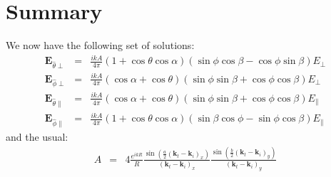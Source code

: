 \documentclass[a4article,12pt]{article}
\newcommand{\kvec}[0]{{\mathbf k}}
\newcommand{\Evec}[0]{{\mathbf E}}
\begin{document}
\section{Summary}

We now have the following set of solutions:
%
\begin{eqnarray}
\Evec_{\hat{\theta} \perp} & = & \frac{i k A}{4 \pi} \left( 1 + \cos \theta \cos \alpha \right) \left(\sin \phi \cos \beta - \cos \phi \sin \beta \right) E_{\perp}\\
\Evec_{\hat{\phi} \perp} & = & \frac{i k A}{4 \pi} \left(\cos \alpha + \cos \theta \right)  \left( \sin \phi \sin \beta + \cos \phi \cos \beta \right) E_{\perp} \\
\Evec_{\hat{\theta} \parallel} & = & \frac{i k A}{4 \pi} \left( \cos \alpha + \cos \theta \right) \left(\sin \phi \sin \beta + \cos \phi \cos \beta  \right) E_{\parallel} \\
\Evec_{\hat{\phi} \parallel} & = & \frac{i k A}{4 \pi} \left( 1+ \cos \theta \cos \alpha \right) \left( \sin \beta \cos \phi - \sin \phi \cos \beta \right) E_{\parallel}
\end{eqnarray}
%
and the usual:
%
\begin{eqnarray}
A & = & 4 \frac{e^{i k R}}{R} \frac{\sin \left( \frac{a}{2} (\kvec_t - \kvec_i )_x \right)}{(\kvec_t - \kvec_i )_x} \frac{\sin \left( \frac{b}{2}( \kvec_t - \kvec_i )_y \right)}{(\kvec_t - \kvec_i )_y}
\end{eqnarray}
\end{document}
